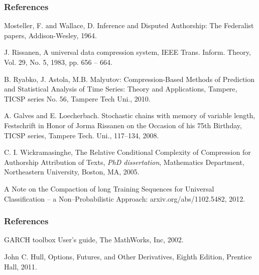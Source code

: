 \documentclass{beamer}
\begin{document}
\begin{frame}
\frametitle{References}
\footnotesize{
\begin{thebibliography}{99} %


 Mosteller, F. and Wallace, D. {Inference and Disputed
Authorship: The Federalist papers}, Addison-Wesley, 1964.


 J. Rissanen, A universal data compression system, IEEE Trans. Inform. Theory, Vol. 29,
No. 5, 1983, pp. 656 -- 664.


 B. Ryabko, J. Astola, M.B. Malyutov:  Compression-Based
Methods of Prediction and Statistical Analysis of Time Series:
Theory and Applications, Tampere, TICSP series No. 56, Tampere Tech Uni., 2010.



 A. Galves and E. Loecherbach. Stochastic chains with memory of variable
length, Festschrift in Honor of Jorma Rissanen on the Occasion of
his 75th Birthday, TICSP series, Tampere Tech. Uni., 117--134, 2008.


 C. I. Wickramasinghe,  The Relative Conditional Complexity of Compression for Authorship Attribution of Texts, \textit{PhD dissertation}, Mathematics
Department, Northeastern University, Boston, MA, 2005.


 A Note on the Compaction of long Training Sequences for Universal Classification -- a Non--Probabilistic Approach:
arxiv.org/abs/1102.5482, 2012.
\end{thebibliography}
}
\end{frame}

\begin{frame}
\frametitle{References}
\footnotesize{
\begin{thebibliography}{99} 
 GARCH toolbox User's guide, The MathWorks, Inc, 2002.

 John C. Hull, Options, Futures, and Other Derivatives, Eighth Edition, Prentice Hall, 2011.

\end{thebibliography}
}
\end{frame}

\end{document}
